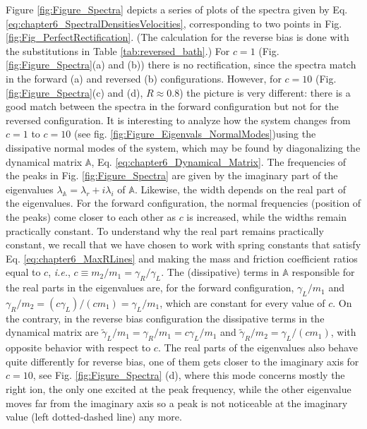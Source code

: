 %
Figure \ref{fig:Figure_Spectra} depicts a series of plots of the spectra given by Eq. \eqref{eq:chapter6_SpectralDensitiesVelocities}, corresponding to two points in Fig. \ref{fig:Fig_PerfectRectification}. (The calculation for the reverse bias is done with the substitutions in Table \ref{tab:reversed_bath}.)
For $c=1$ (Fig. \ref{fig:Figure_Spectra}(a) and (b)) there is no rectification, since the spectra match in the forward (a) and reversed (b) configurations. However, for $c=10$ (Fig. \ref{fig:Figure_Spectra}(c) and (d), $R\approx 0.8$) the picture is very different: there is a good match between the spectra in the forward configuration but not for the reversed configuration. It is interesting to analyze how the system changes from $c=1$ to $c=10$ (see fig. \ref{fig:Figure_Eigenvals_NormalModes})using the dissipative normal modes of the system, which may be found by diagonalizing the dynamical matrix $\mathbb{A}$, Eq. \eqref{eq:chapter6_Dynamical_Matrix}. The frequencies of the peaks in Fig. \ref{fig:Figure_Spectra} are given by the imaginary part of the eigenvalues $\lambda_\mathbb{A} = \lambda_r + i \lambda_i$ of $\mathbb{A}$. Likewise, the width depends on  the real part of the eigenvalues. For the forward configuration, the normal frequencies (position of the peaks) come closer to each other as $c$ is increased, while the widths remain practically constant. To understand why the real part remains practically constant, we recall that we have chosen to work with spring constants that satisfy Eq. \eqref{eq:chapter6_MaxRLines} and making the mass and friction coefficient ratios equal to $c$, \textit{i.e.}, $ c\equiv m_2/m_1 = \gamma_R/\gamma_L$. The (dissipative) terms in $\mathbb{A}$ responsible for the real parts in the eigenvalues are,
for the forward configuration,  $\gamma_L/m_1$ and $\gamma_R/m_2 = (c \gamma_L)/(c m_1) = \gamma_L/m_1$, which are constant for every value of $c$. On the contrary, in the reverse bias configuration  the dissipative terms in the dynamical matrix  are $\tilde{\gamma}_L/m_1 = \gamma_R/m_1 = c\gamma_L/m_1$ and $\tilde{\gamma}_R/m_2 = \gamma_L/ (c m_1)$, with opposite behavior with respect to $c$. The real parts of the eigenvalues
also behave quite differently for reverse bias, one of them gets closer to the imaginary axis for $c=10$,
see Fig. \ref{fig:Figure_Spectra} (d), where this mode  concerns mostly the right ion,
the only one excited at the peak frequency, while the other eigenvalue  moves far from the imaginary axis so a peak is not noticeable
at the imaginary value (left dotted-dashed line) any more.

